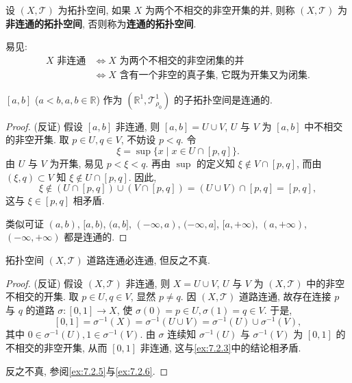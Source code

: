 \begin{definition}\label{def:7.2.3}
设 $(X, \mathcal{T})$ 为拓扑空间, 如果 $X$ 为两个不相交的非空开集的并, 则称 $(X, \mathcal{T})$ 为\textbf{非连通的拓扑空间}, 否则称为\textbf{连通的拓扑空间}.
\end{definition}

易见:
\begin{align*}
  X \text{ 非连通} &\iff X \text{ 为两个不相交的非空闭集的并} \\
  &\iff X \text{ 含有一个非空的真子集, 它既为开集又为闭集}.
\end{align*}

\begin{example}\label{ex:7.2.3}
$[a,b]$ ($a<b, a, b \in \mathbb{R}$) 作为 $(\mathbb{R}^{1}, \mathcal{T}_{\rho_{0}}^{1})$ 的子拓扑空间是连通的.
\end{example}

\begin{proof}
(反证) 假设 $[a,b]$ 非连通, 则 $[a,b] = U \cup V$, $U$ 与 $V$ 为 $[a,b]$ 中不相交的非空开集. 取 $p \in U, q \in V$, 不妨设 $p < q$. 令
\[
  \xi = \sup\{x \mid x \in U \cap [p,q]\}.
\]
由 $U$ 与 $V$ 为开集, 易见 $p < \xi < q$. 再由 $\sup$ 的定义知 $\xi \notin V \cap [p, q]$, 而由 $(\xi, q) \subset V$ 知 $\xi \notin U \cap [p, q]$. 因此,
\[
  \xi \notin (U \cap [p,q]) \cup (V \cap [p,q]) = (U \cup V) \cap [p,q] = [p,q],
\]
这与 $\xi \in [p, q]$ 相矛盾.

类似可证 $(a,b)$, $[a,b)$, $(a,b]$, $(-\infty, a)$, $(-\infty, a]$, $[a, +\infty)$, $(a, +\infty)$, $(-\infty, +\infty)$ 都是连通的.
\end{proof}

\begin{theorem}\label{thm:7.2.5}
拓扑空间 $(X, \mathcal{T})$ 道路连通必连通, 但反之不真.
\end{theorem}

\begin{proof}
(反证) 假设 $(X, \mathcal{T})$ 非连通, 则 $X = U \cup V$, $U$ 与 $V$ 为 $(X, \mathcal{T})$ 中的非空不相交的开集. 取 $p \in U, q \in V$, 显然 $p \neq q$. 因 $(X, \mathcal{T})$ 道路连通, 故存在连接 $p$ 与 $q$ 的道路 $\sigma\colon [0,1] \to X$, 使 $\sigma(0) = p \in U, \sigma(1) = q \in V$. 于是,
\[
  [0,1] = \sigma^{-1}(X) = \sigma^{-1}(U \cup V) = \sigma^{-1}(U) \cup \sigma^{-1}(V),
\]
其中 $0 \in \sigma^{-1}(U), 1 \in \sigma^{-1}(V)$. 由 $\sigma$ 连续知 $\sigma^{-1}(U)$ 与 $\sigma^{-1}(V)$ 为 $[0,1]$ 的不相交的非空开集, 从而 $[0,1]$ 非连通, 这与\cref{ex:7.2.3}中的结论相矛盾.

反之不真, 参阅\cref{ex:7.2.5}与\cref{ex:7.2.6}.
\end{proof}

